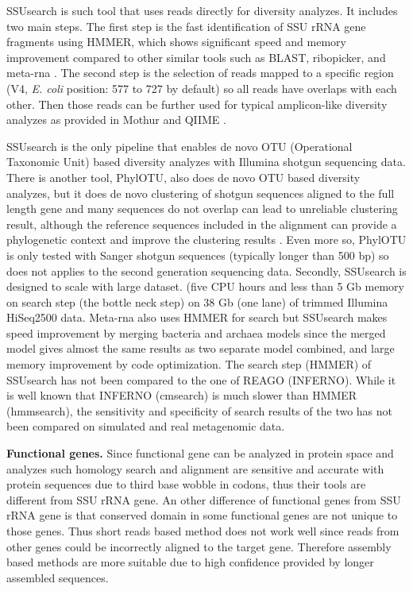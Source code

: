 \documentclass[]{msu-thesis}
\begin{document}
SSUsearch is such tool that uses reads directly for diversity
analyzes. It includes two main steps. The first step is the fast
identification of SSU rRNA gene fragments using HMMER, which shows
significant speed and memory improvement compared to other similar
tools such as BLAST, ribopicker, and meta-rna
\cite{altschul_gapped_1997,schmieder_identification_2012,huang_identification_2009}. The
second step is the selection of reads mapped to a specific region (V4,
\textit{E. coli} position: 577 to 727 by default) so all reads have
overlaps with each other. Then those reads can be further used for
typical amplicon-like diversity analyzes as provided in Mothur and
QIIME \cite{schloss_introducing_2009,kuczynski_using_2012}.

SSUsearch is the only pipeline that enables de novo OTU (Operational
Taxonomic Unit) based diversity analyzes with Illumina shotgun
sequencing data. There is another tool, PhylOTU, also does de novo OTU
based diversity analyzes, but it does de novo clustering of shotgun
sequences aligned to the full length gene and many sequences do not
overlap can lead to unreliable clustering result, although the
reference sequences included in the alignment can provide a
phylogenetic context and improve the clustering results
\cite{sharpton_phylotu:_2011}. Even more so, PhylOTU is only tested
with Sanger shotgun sequences (typically longer than 500 bp) so does
not applies to the second generation sequencing data.  Secondly,
SSUsearch is designed to scale with large dataset. (five CPU hours and
less than 5 Gb memory on search step (the bottle neck step) on 38 Gb
(one lane) of trimmed Illumina HiSeq2500 data. Meta-rna
\cite{huang_identification_2009} also uses HMMER for search but
SSUsearch makes speed improvement by merging bacteria and archaea
models since the merged model gives almost the same results as two
separate model combined, and large memory improvement by code
optimization.  The search step (HMMER) of SSUsearch has not been
compared to the one of REAGO (INFERNO). While it is well known that
INFERNO (cmsearch) is much slower than HMMER (hmmsearch), the
sensitivity and specificity of search results of the two has not been
compared on simulated and real metagenomic data.

\textbf{Functional genes.}  Since functional gene can be analyzed in
protein space and analyzes such homology search and alignment are
sensitive and accurate with protein sequences due to third base wobble
in codons, thus their tools are different from SSU rRNA gene. An other
difference of functional genes from SSU rRNA gene is that conserved
domain in some functional genes are not unique to those genes. Thus
short reads based method does not work well since reads from other
genes could be incorrectly aligned to the target gene. Therefore
assembly based methods are more suitable due to high confidence
provided by longer assembled sequences.
\end{document}
